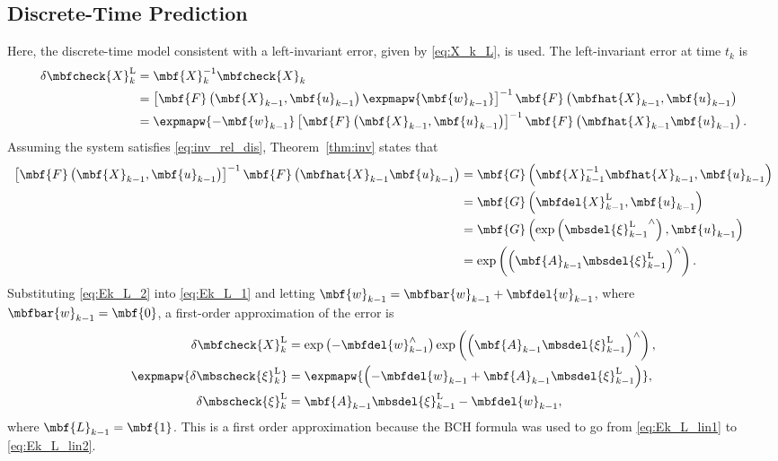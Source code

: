 \subsection{Discrete-Time Prediction}
\label{ssec:DTP_L}

Here, the discrete-time model consistent with a left-invariant error, given by \eqref{eq:X_k_L}, is used. The left-invariant error at time $t_k$ is 
\begin{align}
	\delta \mbfcheck{X}_k^\mathrm{L} & = \mbf{X}_k^{-1} \mbfcheck{X}_k \notag \\
	& = \left[\mbf{F}\left(\mbf{X}_{k-1},\mbf{u}_{k-1}\right)\expmapw{\mbf{w}_{k-1}}\right]^{-1}\mbf{F}\left(\mbfhat{X}_{k-1},\mbf{u}_{k-1}\right) \notag \\
	& = \expmapw{-\mbf{w}_{k-1}}\left[\mbf{F}\left(\mbf{X}_{k-1},\mbf{u}_{k-1}\right)\right]^{-1}\mbf{F}\left(\mbfhat{X}_{k-1}\mbf{u}_{k-1}\right). \label{eq:Ek_L_1}
\end{align}
Assuming the system satisfies \eqref{eq:inv_rel_dis}, Theorem~\ref{thm:inv} states that
\begin{align}
	\left[\mbf{F}\left(\mbf{X}_{k-1},\mbf{u}_{k-1}\right)\right]^{-1}\mbf{F}\left(\mbfhat{X}_{k-1}\mbf{u}_{k-1}\right) & =\mbf{G}\left(\mbf{X}_{k-1}^{-1}\mbfhat{X}_{k-1},\mbf{u}_{k-1}\right) \notag \\ 
	& =\mbf{G}\left(\mbfdel{X}_{k-1}^\mathrm{L},\mbf{u}_{k-1}\right)  \notag \\
	& =\mbf{G}\left(\exp\left({\mbsdel{\xi}_{k-1}^\mathrm{L}}^\wedge\right),\mbf{u}_{k-1}\right) \notag \\ 
	& = \exp\left(\left(\mbf{A}_{k-1} \mbsdel{\xi}_{k-1}^\mathrm{L}\right)^\wedge\right). \label{eq:Ek_L_2}
\end{align}
Substituting \eqref{eq:Ek_L_2} into \eqref{eq:Ek_L_1} and letting $\mbf{w}_{k-1} = \mbfbar{w}_{k-1} + \mbfdel{w}_{k-1}$, where $\mbfbar{w}_{k-1} = \mbf{0}$, a first-order approximation of the error is 
\begin{align}
	\delta \mbfcheck{X}_k^\mathrm{L} & = \exp\left(-\mbfdel{w}_{k-1}^\wedge\right)\exp\left(\left(\mbf{A}_{k-1} \mbsdel{\xi}_{k-1}^\mathrm{L}\right)^\wedge\right), \label{eq:Ek_L_lin1} \\
	\expmapw{{\delta \mbscheck{\xi}_{k}^\mathrm{L}}} & = \expmapw{\left(-\mbfdel{w}_{k-1} + \mbf{A}_{k-1} \mbsdel{\xi}_{k-1}^\mathrm{L}\right)},  \label{eq:Ek_L_lin2} \\
	\delta \mbscheck{\xi}_{k}^\mathrm{L} & = \mbf{A}_{k-1} \mbsdel{\xi}_{k-1}^\mathrm{L} - \mbfdel{w}_{k-1}, \label{eq:Ek_L_lin}
\end{align}
where $\mbf{L}_{k-1} = \mbf{1}$. 
This is a first order approximation because the BCH formula was used to go from \eqref{eq:Ek_L_lin1} to \eqref{eq:Ek_L_lin2}. 

